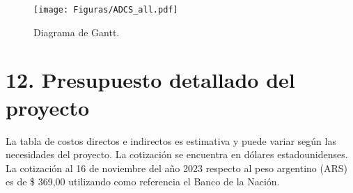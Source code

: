 \documentclass[
11pt, %
]{charter}
\begin{document}
\begin{landscape}

	\begin{figure}[htpb]
		\centering 
		\texttt{[image: Figuras/ADCS\_all.pdf]}
		\caption{ Diagrama de Gantt.} 
		\label{fig:gannt}
	\end{figure}
	
\end{landscape}





\section{12. Presupuesto detallado del proyecto}
\label{sec:presupuesto}

La tabla de costos directos e indirectos es estimativa y puede variar según las necesidades del proyecto. La cotización se encuentra en dólares estadounidenses. La cotización al 16 de noviembre del año 2023 respecto al peso argentino (ARS) es de \$ 369,00 utilizando como referencia el Banco de la Nación. 
\end{document}

